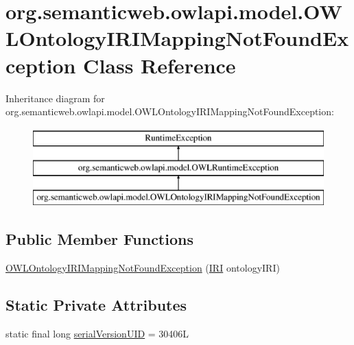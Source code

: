 \hypertarget{classorg_1_1semanticweb_1_1owlapi_1_1model_1_1_o_w_l_ontology_i_r_i_mapping_not_found_exception}{\section{org.\-semanticweb.\-owlapi.\-model.\-O\-W\-L\-Ontology\-I\-R\-I\-Mapping\-Not\-Found\-Exception Class Reference}
\label{classorg_1_1semanticweb_1_1owlapi_1_1model_1_1_o_w_l_ontology_i_r_i_mapping_not_found_exception}
}
Inheritance diagram for org.\-semanticweb.\-owlapi.\-model.\-O\-W\-L\-Ontology\-I\-R\-I\-Mapping\-Not\-Found\-Exception\-:\begin{figure}[H]
\begin{center}
\leavevmode
\includegraphics[height=3.000000cm]{classorg_1_1semanticweb_1_1owlapi_1_1model_1_1_o_w_l_ontology_i_r_i_mapping_not_found_exception}
\end{center}
\end{figure}
\subsection*{Public Member Functions}
\begin{DoxyCompactItemize}
\item 
\hyperlink{classorg_1_1semanticweb_1_1owlapi_1_1model_1_1_o_w_l_ontology_i_r_i_mapping_not_found_exception_a06bea5681de9443b02e8132c6b9d598e}{O\-W\-L\-Ontology\-I\-R\-I\-Mapping\-Not\-Found\-Exception} (\hyperlink{classorg_1_1semanticweb_1_1owlapi_1_1model_1_1_i_r_i}{I\-R\-I} ontology\-I\-R\-I)
\end{DoxyCompactItemize}
\subsection*{Static Private Attributes}
\begin{DoxyCompactItemize}
\item 
static final long \hyperlink{classorg_1_1semanticweb_1_1owlapi_1_1model_1_1_o_w_l_ontology_i_r_i_mapping_not_found_exception_a8d24bf51cb342d55bfcdefcfaef82d10}{serial\-Version\-U\-I\-D} = 30406\-L
\end{DoxyCompactItemize}


